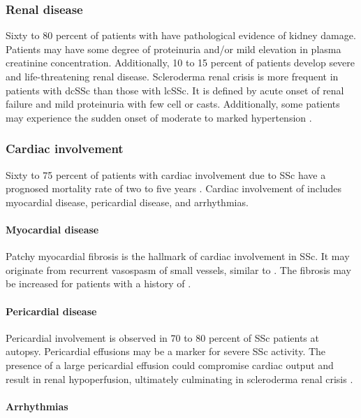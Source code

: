 \subsubsection{Renal disease}

Sixty to 80 percent of patients with \dcSSc have pathological evidence of
kidney damage. Patients may have some degree of proteinuria and/or mild
elevation in plasma creatinine concentration. Additionally, 10 to 15 percent
of patients develop severe and life-threatening renal disease. Scleroderma
renal crisis is more frequent in patients with dcSSc than those with lcSSc. It
is defined by acute onset of renal failure and mild proteinuria with few cell
or casts. Additionally, some patients may experience the sudden onset of
moderate to marked hypertension \citep{overviewSSc}.

\subsubsection{Cardiac involvement}

Sixty to 75 percent of patients with cardiac involvement due to SSc have a
prognosed mortality rate of two to five years \citep{overviewSSc}. Cardiac
involvement of \SSc includes myocardial disease, pericardial disease, and
arrhythmias.

\paragraph{Myocardial disease} 

Patchy myocardial fibrosis is the hallmark of cardiac involvement in SSc. It
may originate from recurrent vasospasm of small vessels, similar to \Rp. The
fibrosis may be increased for patients with a history of \Rp
\citep{overviewSSc}.

\paragraph{Pericardial disease}

Pericardial involvement is observed in 70 to 80 percent of SSc patients at
autopsy. Pericardial effusions may be a marker for severe SSc activity. The
presence of a large pericardial effusion could compromise cardiac output and
result in renal hypoperfusion, ultimately culminating in scleroderma renal
crisis \citep{overviewSSc}.

\paragraph{Arrhythmias}

